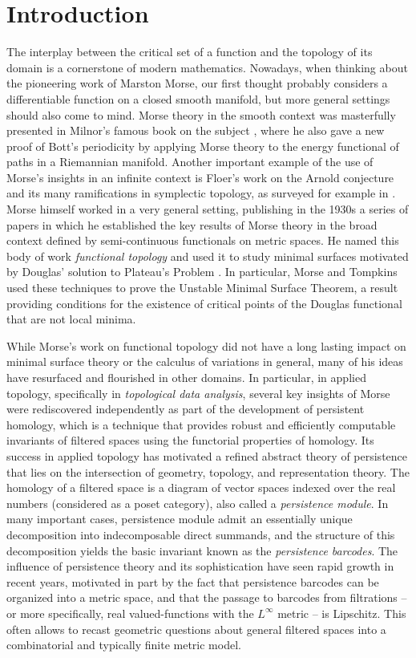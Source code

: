 
\section{Introduction}

The interplay between the critical set of a function and the topology of its domain is a cornerstone of modern mathematics.
Nowadays, when thinking about the pioneering work of Marston Morse, our first thought probably considers a differentiable function on a closed smooth manifold, but more general settings should also come to mind.
Morse theory in the smooth context was masterfully presented in Milnor's famous book on the subject \cite{MR0163331}, where he also gave a new proof of Bott's periodicity by applying Morse theory to the energy functional of paths in a Riemannian manifold.
Another important example of the use of Morse's insights in an infinite context is Floer's work on the Arnold conjecture and its many ramifications in symplectic topology, as surveyed for example in \cite{MR1702944}.
Morse himself worked in a very general setting, publishing in the 1930s a series of papers \cite{Morse.1937, Morse.1938, Morse.1940, MR9102} in which he established the key results of Morse theory in the broad context defined by semi-continuous functionals on metric spaces.
He named this body of work \emph{functional topology} and used it to study minimal surfaces motivated by Douglas' solution to Plateau’s Problem \cite{Douglas.1931}.
In particular, Morse and Tompkins \cite{Morse.1939, Morse.1941} used these techniques to prove the Unstable Minimal Surface Theorem, a result providing conditions for the existence of critical points of the Douglas functional that are not local minima.

While Morse's work on functional topology did not have a long lasting impact on minimal surface theory or the calculus of variations in general, many of his ideas have resurfaced and flourished in other domains.
In particular, in applied topology, specifically in \emph{topological data analysis}, several key insights of Morse were rediscovered independently as part of the development of persistent homology, which is
a technique that provides robust and efficiently computable invariants of filtered spaces using the functorial properties of homology.
Its success in applied topology has motivated a refined abstract theory of persistence that lies on the intersection of geometry, topology, and representation theory.
The homology of a filtered space is a diagram of vector spaces indexed over the real numbers (considered as a poset category), also called a \emph{persistence module}.
In many important cases, persistence module admit an essentially unique decomposition into indecomposable direct summands, and the structure of this decomposition yields the basic invariant known as the \emph{persistence barcodes}.
The influence of persistence theory and its sophistication have seen rapid growth in recent years, motivated in part by the fact that persistence barcodes can be organized into a metric space, and that the passage to barcodes from filtrations -- or more specifically, real valued-functions with the $L^\infty$ metric -- is Lipschitz.
This often allows to recast geometric questions about general filtered spaces into a combinatorial and typically finite metric model.

